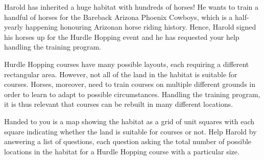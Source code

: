 





Harold has inherited a huge habitat with hundreds of horses!
He wants to train a handful of horses for the Bareback Arizona Phoenix Cowboys, which is a half-yearly happening honouring Arizonan horse riding history.
Hence, Harold signed his horses up for the Hurdle Hopping event and he has requested your help handling the training program.

Hurdle Hopping courses have many possible layouts, each requiring a different rectangular area.
However, not all of the land in the habitat is suitable for courses.
Horses, moreover, need to train courses on multiple different grounds in order to learn to adapt to possible circumstances.
Handling the training program, it is thus relevant that courses can be rebuilt in many different locations.

Handed to you is a map showing the habitat as a grid of unit squares with each square indicating whether the land is suitable for courses or not.
Help Harold by answering a list of questions,
each question asking the total number of possible locations in the habitat
for a Hurdle Hopping course with a particular size.

